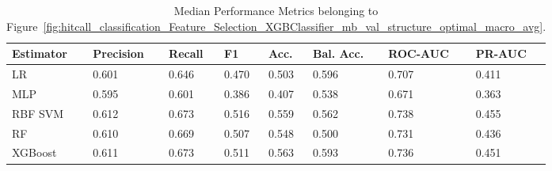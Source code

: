 \begin{longtable}{llllllll}
\caption{Median Performance Metrics belonging to Figure~\ref{fig:hitcall_classification_Feature_Selection_XGBClassifier_mb_val_structure_optimal_macro_avg}.}\label{tab:table:hitcall_classification_feature_selection_xgbclassifier_mb_val_structure_optimal_macro_avg}\\
\toprule
\midrule
\small Estimator & \small Precision & \small Recall & \small F1 & \small Acc. & \small Bal. Acc. & \small ROC-AUC & \small PR-AUC\\
\hline
LR & 0.601 & 0.646 & 0.470 & 0.503 & 0.596 & 0.707 & 0.411\\
MLP & 0.595 & 0.601 & 0.386 & 0.407 & 0.538 & 0.671 & 0.363\\
RBF SVM & 0.612 & 0.673 & 0.516 & 0.559 & 0.562 & 0.738 & 0.455\\
RF & 0.610 & 0.669 & 0.507 & 0.548 & 0.500 & 0.731 & 0.436\\
XGBoost & 0.611 & 0.673 & 0.511 & 0.563 & 0.593 & 0.736 & 0.451\\
\bottomrule
\end{longtable}